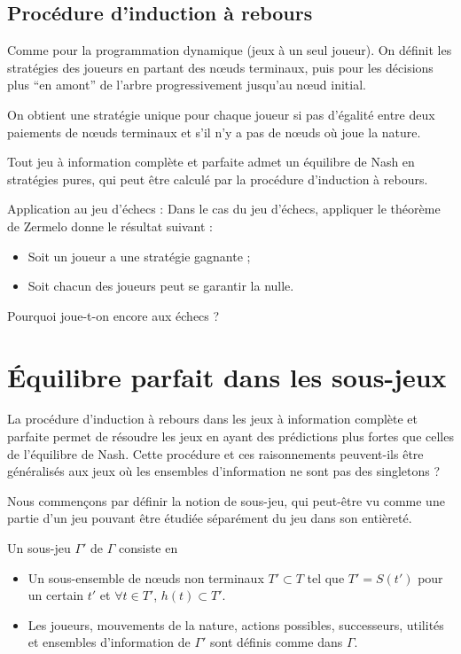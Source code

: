 \subsection{Procédure d'induction à rebours} Comme pour la
programmation dynamique (jeux à un seul joueur). On définit les
stratégies des joueurs en partant des n{\oe}uds terminaux, puis
pour les décisions plus ``en amont'' de l'arbre progressivement
jusqu'au n{\oe}ud initial.

On obtient une stratégie unique pour chaque joueur si pas
d'égalité entre deux paiements de n{\oe}uds terminaux et s'il n'y
a pas de n{\oe}uds où joue la nature.

\begin{theoreme}
Tout jeu à information complète et parfaite admet un équilibre de
Nash en stratégies pures, qui peut \^etre calculé par la procédure
d'induction à rebours.
\end{theoreme}

 Application au jeu d'échecs : Dans le cas du jeu d'échecs,
appliquer le théorème de Zermelo donne le résultat suivant :
\begin{itemize}
\item Soit un joueur a une stratégie gagnante ;
\item Soit chacun des joueurs peut se garantir la nulle.
\end{itemize}
Pourquoi joue-t-on encore aux échecs ?

\section{\'Equilibre parfait dans les sous-jeux}
La procédure d'induction à rebours dans les jeux à information
complète et parfaite permet de résoudre les jeux en ayant des
prédictions plus fortes que celles de l'équilibre de Nash. Cette
procédure et ces raisonnements peuvent-ils être généralisés aux
jeux où les ensembles d'information ne sont pas des singletons ?

Nous commençons par définir la notion de sous-jeu, qui peut-être
vu comme une partie d'un jeu pouvant être étudiée séparément du
jeu dans son entièreté.

\begin{definition} Un sous-jeu $\Gamma'$ de $\Gamma$ consiste en
\begin{itemize}
\item Un sous-ensemble de n{\oe}uds non terminaux $T'\subset T$ tel que $T' = S(t')$ pour
un certain $t'$ et $\forall t\in T'$, $h(t)\subset T'$.
\item Les joueurs, mouvements de la nature, actions possibles, successeurs,
utilités et ensembles d'information de $\Gamma'$ sont définis
comme dans $\Gamma$.
\end{itemize}
\end{definition}


